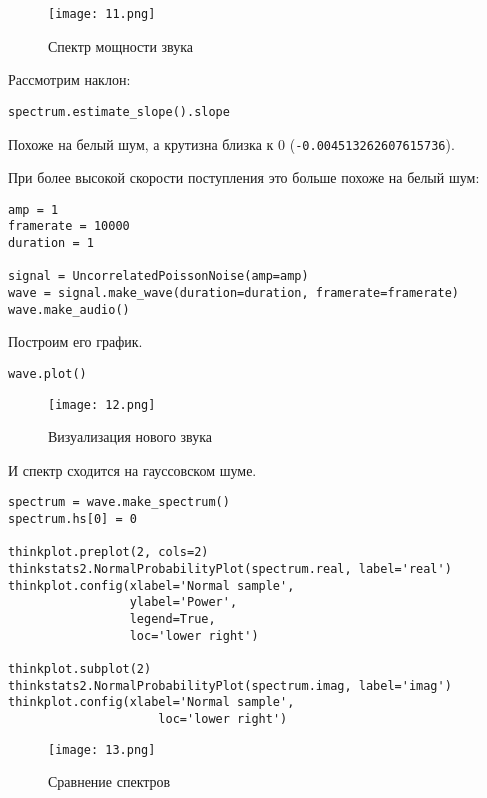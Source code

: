 \documentclass[a4paper,12pt]{report}
\begin{document}
\begin{figure}[H]
        \centering
        \texttt{[image: 11.png]}
        \caption{Спектр мощности звука}
        \label{fig:lab4_fig4_2}
\end{figure}

Рассмотрим наклон:

\begin{lstlisting}[caption=Наклон прямой]
spectrum.estimate_slope().slope
\end{lstlisting}

Похоже на белый шум, а крутизна близка к 0 (\texttt{-0.004513262607615736}).

При более высокой скорости поступления это больше похоже на белый шум:

\begin{lstlisting}[caption=Создание нового звука]
amp = 1
framerate = 10000
duration = 1

signal = UncorrelatedPoissonNoise(amp=amp)
wave = signal.make_wave(duration=duration, framerate=framerate)
wave.make_audio()
\end{lstlisting}

Построим его график.

\begin{lstlisting}[caption=Визуализация нового звука]
wave.plot()
\end{lstlisting}

\begin{figure}[H]
        \centering
        \texttt{[image: 12.png]}
        \caption{Визуализация нового звука}
        \label{fig:lab4_fig4_3}
\end{figure}

И спектр сходится на гауссовском шуме.

\begin{lstlisting}[caption=Сравнение спектров]
spectrum = wave.make_spectrum()
spectrum.hs[0] = 0

thinkplot.preplot(2, cols=2)
thinkstats2.NormalProbabilityPlot(spectrum.real, label='real')
thinkplot.config(xlabel='Normal sample',
                 ylabel='Power',
                 legend=True,
                 loc='lower right')

thinkplot.subplot(2)
thinkstats2.NormalProbabilityPlot(spectrum.imag, label='imag')
thinkplot.config(xlabel='Normal sample',
                     loc='lower right')
\end{lstlisting}

\begin{figure}[H]
        \centering
        \texttt{[image: 13.png]}
        \caption{Сравнение спектров}
        \label{fig:lab4_fig4_4}
\end{figure}
\end{document}
